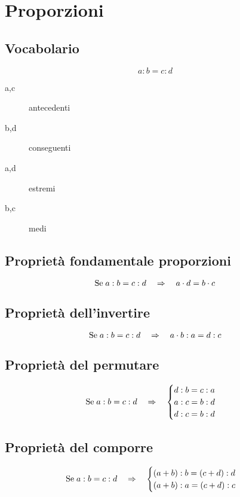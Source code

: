 \chapter{Proporzioni}
\section{Vocabolario}
\[a:b=c:d\]
\begin{description}
	\item[a,c] antecedenti
	\item[b,d] conseguenti
	\item[a,d] estremi
	\item[b,c] medi
\end{description}
\section{Proprietà fondamentale proporzioni}
\begin{equation*}                       
	\text{Se\;}a:b=c:d\quad\Rightarrow\quad a\cdot d=b\cdot c
\end{equation*}
\section{Proprietà dell'invertire}
\begin{equation*}                       
\text{Se\;}a:b=c:d\quad\Rightarrow\quad a\cdot b:a=d:c
\end{equation*}
\section{Proprietà del permutare}
\begin{equation*}                       
\text{Se\;}a:b=c:d\quad\Rightarrow\quad \begin{cases}
d:b=c:a\\
a:c=b:d\\
d:c=b:d
\end{cases}
\end{equation*}
\section{Proprietà del comporre}
\begin{equation*}                       
\text{Se\;}a:b=c:d\quad\Rightarrow\quad \begin{cases}
(a+b):b=(c+d):d\\
(a+b):a=(c+d):c
\end{cases}
\end{equation*}

